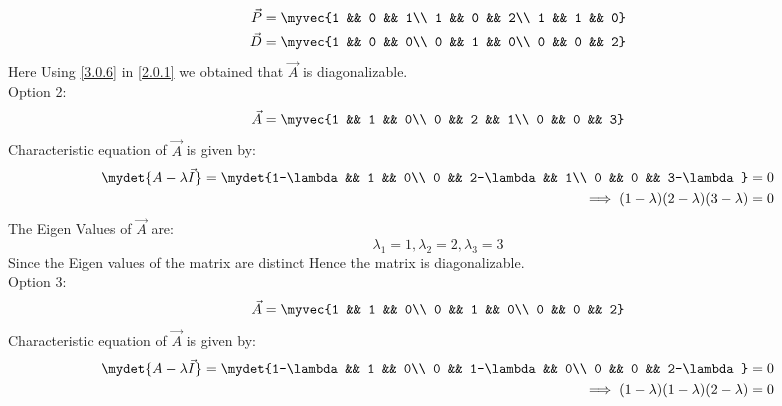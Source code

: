 \documentclass[journal,12pt,twocolumn]{IEEEtran}
\begin{document}
\begin{equation}\label{3.0.6}
\begin{split}
\vec{P} = \myvec{1 && 0 && 1\\ 1 && 0 && 2\\ 1 && 1 && 0}\\
\vec{D} = \myvec{1 && 0 && 0\\ 0 && 1 && 0\\ 0 && 0 && 2}
\end{split}
\end{equation}
Here Using \eqref{3.0.6} in \eqref{2.0.1} we obtained that $\vec{A}$ is diagonalizable.\\
Option 2:
\begin{equation*}
\vec{A} = \myvec{1 && 1 && 0\\ 0 && 2 && 1\\ 0 && 0 && 3}
\end{equation*}
Characteristic equation of $\vec{A}$ is given by:
\begin{equation} \label{3.0.7}
\begin{split}
\mydet{A-\lambda \vec{I}}=\mydet{1-\lambda && 1 && 0\\ 0 && 2-\lambda && 1\\ 0 && 0 && 3-\lambda} = 0\\
\implies (1-\lambda)(2-\lambda)(3-\lambda) = 0
\end{split}
\end{equation}
The Eigen Values of $\vec{A}$ are:
\begin{equation} \label{3.0.8}
\lambda_1 = 1, \lambda_2 = 2, \lambda_3 = 3
\end{equation}
Since the Eigen values of the matrix are distinct Hence the matrix is diagonalizable.\\
Option 3:
\begin{equation*}
\vec{A} = \myvec{1 && 1 && 0\\ 0 && 1 && 0\\ 0 && 0 && 2}
\end{equation*}
Characteristic equation of $\vec{A}$ is given by:
\begin{equation} \label{3.0.9}
\begin{split}
\mydet{A-\lambda \vec{I}}=\mydet{1-\lambda && 1 && 0\\ 0 && 1-\lambda && 0\\ 0 && 0 && 2-\lambda} = 0\\
\implies (1-\lambda)(1-\lambda)(2-\lambda) = 0
\end{split}
\end{equation}
\end{document}
